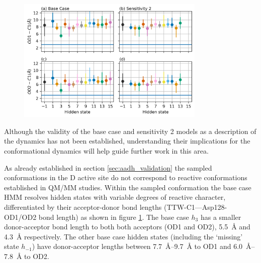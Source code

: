 \begin{figure}
    \centering
    \includegraphics[width=0.8\textwidth]{chapters/aadh/figures/bond_dist_h_states.png}
    \label{fig:addh_bond_dist_h_state}
\end{figure}

Although the validity of the base case and sensitivity 2 models as a description of the dynamics has not been established, understanding their implications for the conformational dynamics will help guide further work in this area. 

As already established in section \ref{sec:aadh_validation} the sampled conformations in the D active site do not correspond to reactive conformations established in QM/MM studies.  Within the sampled conformation the base case HMM resolves hidden states with variable degrees of reactive character,  differentiated by their acceptor-donor bond lengths (TTW-C1---Asp128-OD1/OD2 bond length) as shown in figure \ref{fig:addh_bond_dist_h_state}. The base case $h_{3}$ has a smaller donor-acceptor bond length to both both acceptors (OD1 and OD2), \SI{5.5}{\angstrom} and \SI{4.3}{\angstrom} respectively. The other base case hidden states (including the `missing' state $h_{-1}$) have donor-acceptor lengths between \SIrange{7.7}{9.7}{\angstrom} to OD1 and \SIrange{6.0}{7.8}{\angstrom} to OD2. 

